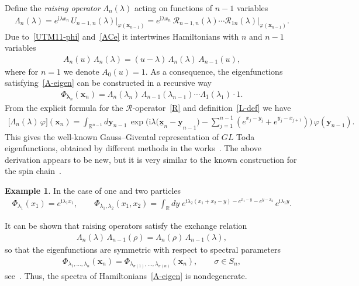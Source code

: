 \documentclass[11pt]{article}
\numberwithin{equation}{section}
\theoremstyle{plain}
\theoremstyle{definition}
\newtheorem{example}{Example}
\renewcommand{\phi}{\varphi}
\renewcommand{\imath}{\mathrm{i}}
\begin{document}
Define the \textit{raising operator} $\Lambda_{n}(\lambda)$ acting on functions of $n - 1$ variables 
\begin{align} \label{L-def}
	\Lambda_{n}(\lambda) =  e^{\imath \lambda x_{n}} \, U_{n - 1, n}(\lambda) \bigr|_{\phi(\bm{x}_{n - 1})} = e^{\imath \lambda x_{n}} \, \mathcal{R}_{n - 1 , n }(\lambda) \cdots \mathcal{R}_{1 n }(\lambda) \bigr|_{\phi(\bm{x}_{n - 1})}.
\end{align}
Due to~\eqref{UTM11-phi} and~\eqref{ACe} it intertwines Hamiltonians with $n$ and $n - 1$ variables
\begin{align}
	A_{n}(u) \, \Lambda_{n}(\lambda) = (u - \lambda) \, \Lambda_{n}(\lambda) \, A_{n - 1}(u),
\end{align}
where for $n = 1$ we denote $A_0(u) = 1$. As a consequence, the eigenfunctions satisfying~\eqref{A-eigen} can be constructed in a recursive way
\begin{align} \label{Phi-def}
	\Phi_{\bm{\lambda}_n}(\bm{x}_n) = \Lambda_n(\lambda_n) \, \Lambda_{n - 1}(\lambda_{n - 1}) \cdots \Lambda_1(\lambda_1) \cdot 1.
\end{align}
From the explicit formula for the $\mathcal{R}$-operator~\eqref{R} and definition~\eqref{L-def} we have
\begin{align}
	\bigl[ \Lambda_{n}(\lambda) \, \phi \bigr] (\bm{x}_{n}) = \int_{\mathbb{R}^{n - 1}} d\bm{y}_{n - 1} \,  \exp \biggl( \imath \lambda \bigl(\underline{\bm{x}}_{n} - \underline{\bm{y}}_{n - 1} \bigr)  - \sum_{j = 1}^{n - 1} (e^{x_j - y_j} + e^{y_j - x_{j + 1}}) \biggr)
	\, \phi(\bm{y}_{n - 1}).
\end{align}
This gives the well-known Gauss--Givental representation of $GL$ Toda eigenfunctions, obtained by different methods in the works~\cite{G, GKLO, Sil}. The above derivation appears to be new, but it is very similar to the known construction for the spin chain~\cite{ADV}.

\begin{example}
	In the case of one and two particles
	\begin{align}
		\Phi_{\lambda_1}(x_1) = e^{\imath \lambda_1 x_1}, \qquad \Phi_{\lambda_1, \lambda_2}(x_1, x_2) = \int_{\mathbb{R}} dy \; e^{ \imath \lambda_2 (x_1 + x_2 - y)  - e^{x_1 - y} - e^{y - x_2}} \, e^{\imath \lambda_1 y}.
	\end{align}
\end{example}

It can be shown that raising operators satisfy the exchange relation
\begin{align}
	\Lambda_n(\lambda) \, \Lambda_{n - 1}(\rho) = \Lambda_n(\rho) \, \Lambda_{n - 1}(\lambda),
\end{align}
so that the eigenfunctions are symmetric with respect to spectral parameters
\begin{align} \label{Phi-sym}
	\Phi_{\lambda_1, \dots, \lambda_n}(\bm{x}_n) = \Phi_{\lambda_{\sigma(1)}, \dots, \lambda_{\sigma(n)}}(\bm{x}_n), \qquad \sigma \in S_n,
\end{align}
see~\cite[Theorem 1]{Sil}. Thus, the spectra of Hamiltonians~\eqref{A-eigen} is nondegenerate.
\end{document}
